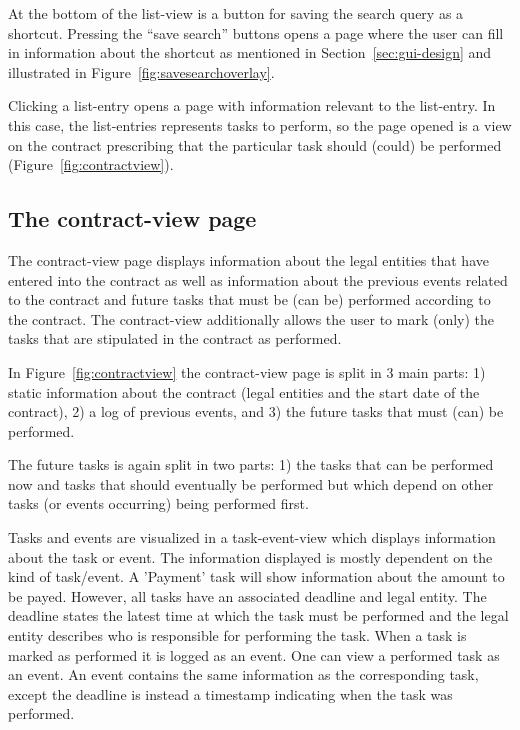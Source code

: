 \documentclass[envcountsame]{llncs}
\begin{document}
At the bottom of the list-view is a button for saving the search query
as a shortcut. Pressing the ``save search'' buttons opens a page where
the user can fill in information about the shortcut as mentioned in
Section~\ref{sec:gui-design} and illustrated in
Figure~\ref{fig:savesearchoverlay}.

Clicking a list-entry opens a page with information relevant to the
list-entry. In this case, the list-entries represents tasks to
perform, so the page opened is a view on the contract prescribing that
the particular task should (could) be performed
(Figure~\ref{fig:contractview}).

\subsection{The contract-view page}
\label{sec:contractview}

The contract-view page displays information about the legal entities
that have entered into the contract as well as information about the
previous events related to the contract and future tasks that must be
(can be) performed according to the contract. The contract-view
additionally allows the user to mark (only) the tasks that are
stipulated in the contract as performed.

In Figure~\ref{fig:contractview} the contract-view page is split in 3
main parts: 1) static information about the contract (legal entities
and the start date of the contract), 2) a log of previous events, and
3) the future tasks that must (can) be performed.

The future tasks is again split in two parts: 1) the tasks that can be
performed now and tasks that should eventually be performed but which
depend on other tasks (or events occurring) being performed first.

Tasks and events are visualized in a task-event-view which displays
information about the task or event. The information displayed is
mostly dependent on the kind of task/event. A 'Payment' task will show
information about the amount to be payed. However, all tasks have an
associated deadline and legal entity. The deadline states the latest
time at which the task must be performed and the legal entity
describes who is responsible for performing the task. When a task is
marked as performed it is logged as an event. One can view a performed
task as an event. An event contains the same information as the
corresponding task, except the deadline is instead a timestamp
indicating when the task was performed. 
\end{document}
